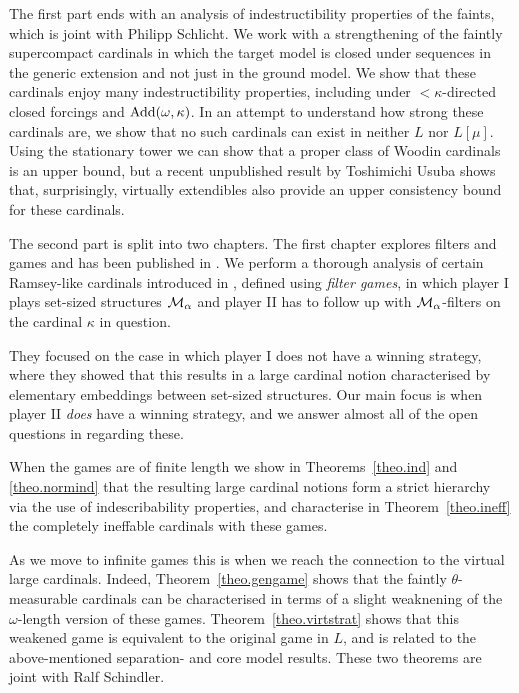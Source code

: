 \documentclass[../main]{subfiles}
\begin{document}
\begin{onehalfspacing}
\quad The first part ends with an analysis of indestructibility properties of the faints, which is joint with Philipp Schlicht. We work with a strengthening of the faintly supercompact cardinals in which the target model is closed under sequences in the generic extension and not just in the ground model. We show that these cardinals enjoy many indestructibility properties, including under ${<}\kappa$-directed closed forcings and $\operatorname{Add}(\omega,\kappa)$. In an attempt to understand how strong these cardinals are, we show that no such cardinals can exist in neither $L$ nor $L[\mu]$. Using the stationary tower we can show that a proper class of Woodin cardinals is an upper bound, but a recent unpublished result by Toshimichi Usuba shows that, surprisingly, virtually extendibles also provide an upper consistency bound for these cardinals.

\quad The second part is split into two chapters. The first chapter explores filters and games and has been published in \cite{NielsenWelch}. We perform a thorough analysis of certain Ramsey-like cardinals introduced in \cite{HolySchlicht}, defined using \textit{filter games}, in which player I plays set-sized structures $\operatorname{\mathcal M}_\alpha$ and player II has to follow up with $\operatorname{\mathcal M}_\alpha$-filters on the cardinal $\kappa$ in question.

\quad They focused on the case in which player I does not have a winning strategy, where they showed that this results in a large cardinal notion characterised by elementary embeddings between set-sized structures. Our main focus is when player II \textit{does} have a winning strategy, and we answer almost all of the open questions in \cite{HolySchlicht} regarding these.

\quad When the games are of finite length we show in Theorems~\ref{theo.ind} and \ref{theo.normind} that the resulting large cardinal notions form a strict hierarchy via the use of indescribability properties, and characterise in Theorem~\ref{theo.ineff} the completely ineffable cardinals with these games.

\quad As we move to infinite games this is when we reach the connection to the virtual large cardinals. Indeed, Theorem~\ref{theo.gengame} shows that the faintly $\theta$-measurable cardinals can be characterised in terms of a slight weaknening of the $\omega$-length version of these games. Theorem~\ref{theo.virtstrat} shows that this weakened game is equivalent to the original game in $L$, and is related to the above-mentioned separation- and core model results. These two theorems are joint with Ralf Schindler. 


\end{onehalfspacing}
\end{document}
